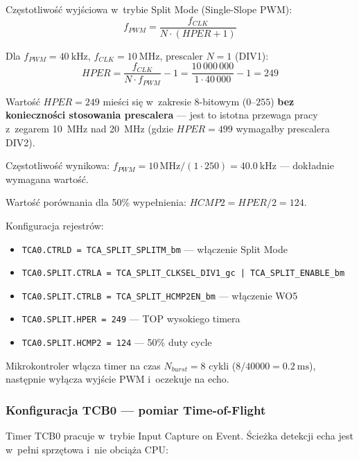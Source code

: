\documentclass[a4paper,11pt]{article}
\begin{document}
	Częstotliwość wyjściowa w~trybie Split Mode (Single-Slope PWM):
	\begin{equation}
		f_{PWM} = \frac{f_{CLK}}{N \cdot (HPER + 1)}
		\label{eq:pwm_freq}
	\end{equation}
	
	Dla $f_{PWM} = \SI{40}{\kilo\hertz}$, $f_{CLK} = \SI{10}{\mega\hertz}$,
	prescaler $N = 1$ (DIV1):
	\begin{equation}
		HPER = \frac{f_{CLK}}{N \cdot f_{PWM}} - 1 = \frac{10\,000\,000}{1 \cdot 40\,000} - 1 = 249
		\label{eq:per_value}
	\end{equation}
	
	Wartość $HPER = 249$ mieści się w~zakresie 8-bitowym ($0$--$255$)
	\textbf{bez konieczności stosowania prescalera} --- jest to istotna
	przewaga pracy z~zegarem \SI{10}{\mega\hertz} nad \SI{20}{\mega\hertz}
	(gdzie $HPER = 499$ wymagałby prescalera DIV2).
	
	Częstotliwość wynikowa:
	$f_{PWM} = 10\,\text{MHz} / (1 \cdot 250) = \SI{40,0}{\kilo\hertz}$ --- dokładnie
	wymagana wartość.
	
	Wartość porównania dla 50\% wypełnienia: $HCMP2 = HPER/2 = 124$.
	
	Konfiguracja rejestrów:
	\begin{itemize}[nosep]
		\item \texttt{TCA0.CTRLD = TCA\_SPLIT\_SPLITM\_bm} --- włączenie Split Mode
		\item \texttt{TCA0.SPLIT.CTRLA = TCA\_SPLIT\_CLKSEL\_DIV1\_gc | TCA\_SPLIT\_ENABLE\_bm}
		\item \texttt{TCA0.SPLIT.CTRLB = TCA\_SPLIT\_HCMP2EN\_bm} --- włączenie WO5
		\item \texttt{TCA0.SPLIT.HPER = 249} --- TOP wysokiego timera
		\item \texttt{TCA0.SPLIT.HCMP2 = 124} --- 50\% duty cycle
	\end{itemize}
	
	Mikrokontroler włącza timer na czas $N_{burst} = 8$ cykli
	($8/40000 = \SI{0,2}{\milli\second}$), następnie wyłącza wyjście PWM
	i~oczekuje na echo.
	
	\subsubsection{Konfiguracja TCB0 --- pomiar Time-of-Flight}
	
	Timer TCB0 pracuje w~trybie Input Capture on Event. Ścieżka detekcji
	echa jest w~pełni sprzętowa i~nie obciąża CPU:
	
\end{document}
